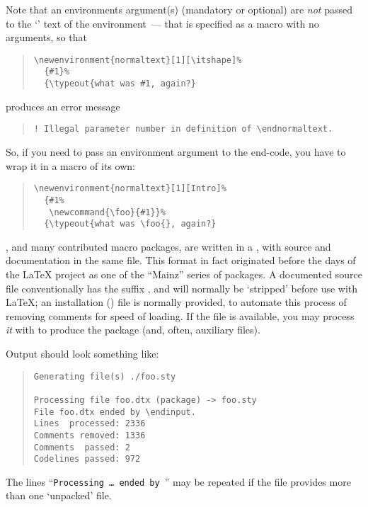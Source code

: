 Note that an environments argument(s) (mandatory or optional) are
\emph{not} passed to the `' text of the environment~--- that
is specified as a macro with no arguments, so that
\begin{quote}
\begin{verbatim}
\newenvironment{normaltext}[1][\itshape]%
  {#1}%
  {\typeout{what was #1, again?}
\end{verbatim}
\end{quote}
produces an error message
\begin{quote}
\begin{verbatim}
! Illegal parameter number in definition of \endnormaltext.
\end{verbatim}
\end{quote}
So, if you need to pass an environment argument to the end-code, you
have to wrap it in a macro of its own:
\begin{quote}
\begin{verbatim}
\newenvironment{normaltext}[1][Intro]%
  {#1%
   \newcommand{\foo}{#1}}%
  {\typeout{what was \foo{}, again?}
\end{verbatim}
\end{quote}


\LaTeXe{}, and many contributed \latex{} macro packages, are written
in a , with source and
documentation in the
same file.  This format in fact originated before the
days of the \LaTeX{} project as one of the ``Mainz'' series of
packages.  A documented source file conventionally has the suffix
, and will normally be `stripped' before use with
\LaTeX{}; an installation () file is normally provided,
to automate this process of removing comments for speed of loading.
If the  file is available, you may process \emph{it}
with \latex{} to produce the package (and, often, auxiliary files).

Output should look something like:
\begin{quote}
\begin{verbatim}
Generating file(s) ./foo.sty 

Processing file foo.dtx (package) -> foo.sty
File foo.dtx ended by \endinput.
Lines  processed: 2336
Comments removed: 1336
Comments  passed: 2
Codelines passed: 972
\end{verbatim}
\end{quote}
The lines ``\texttt{Processing \dots{}\ ended by }'' may
be repeated if the  file provides more than one
`unpacked' file.

